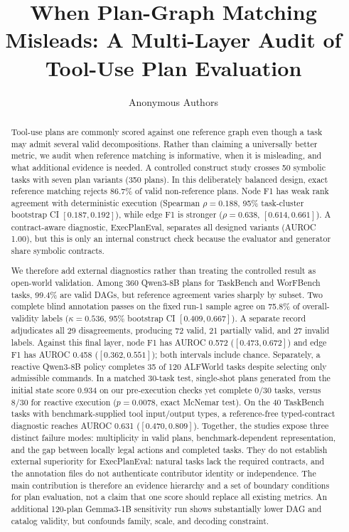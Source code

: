 \documentclass[10pt]{article}
\title{When Plan-Graph Matching Misleads: A Multi-Layer Audit of Tool-Use Plan Evaluation}
\author{Anonymous Authors}
\date{}
\begin{document}
\maketitle

\begin{abstract}
Tool-use plans are commonly scored against one reference graph even though a
task may admit several valid decompositions. Rather than claiming a universally
better metric, we audit when reference matching is informative, when it is
misleading, and what additional evidence is needed. A controlled construct
study crosses 50 symbolic tasks
with seven plan variants (350 plans). In this deliberately balanced design,
exact reference matching rejects 86.7\% of valid non-reference plans. Node F1
has weak rank agreement with deterministic execution (Spearman $\rho=0.188$,
95\% task-cluster bootstrap CI $[0.187,0.192]$), while edge F1 is stronger
($\rho=0.638$, $[0.614,0.661]$). A contract-aware diagnostic, ExecPlanEval,
separates all designed variants (AUROC 1.00), but this is only an internal
construct check because the evaluator and generator share symbolic contracts.

We therefore add external diagnostics rather than treating the controlled
result as open-world validation. Among 360 Qwen3-8B plans for TaskBench and
WorFBench tasks, 99.4\% are valid DAGs, but reference agreement varies sharply
by subset. Two complete blind annotation passes on the fixed run-1 sample agree
on 75.8\% of overall-validity labels ($\kappa=0.536$, 95\% bootstrap CI
$[0.409,0.667]$). A separate record adjudicates all 29 disagreements, producing
72 valid, 21 partially valid, and 27 invalid labels. Against this final layer,
node F1 has AUROC 0.572 ($[0.473,0.672]$) and edge F1 has AUROC 0.458
($[0.362,0.551]$); both intervals include chance. Separately, a reactive
Qwen3-8B policy completes 35 of 120 ALFWorld tasks despite selecting only
admissible commands. In a matched 30-task test, single-shot plans generated
from the initial state score 0.934 on our pre-execution checks yet complete
0/30 tasks, versus 8/30 for reactive execution ($p=0.0078$, exact McNemar
test). On the 40 TaskBench tasks with benchmark-supplied tool
input/output types, a reference-free typed-contract diagnostic reaches AUROC
0.631 ($[0.470,0.809]$). Together, the studies expose three distinct failure
modes: multiplicity in valid plans, benchmark-dependent representation, and
the gap between locally legal actions and completed tasks. They do not establish
external superiority for ExecPlanEval: natural tasks lack the required
contracts, and the annotation files do not authenticate contributor identity or
independence. The main contribution is therefore an evidence hierarchy and a
set of boundary conditions for plan evaluation, not a claim that one score
should replace all existing metrics.
An additional 120-plan Gemma3-1B sensitivity run shows substantially lower DAG
and catalog validity, but confounds family, scale, and decoding constraint.
\end{abstract}
\end{document}
